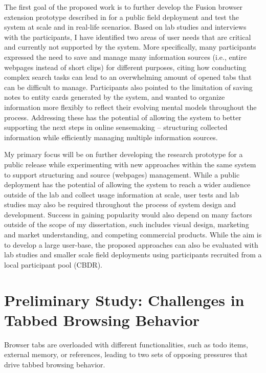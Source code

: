 

The first goal of the proposed work is to further develop the Fusion browser extension prototype described in  for a public field deployment and test the system at scale and in real-life scenarios. Based on lab studies and interviews with the participants, I have identified two areas of user needs that are critical and currently not supported by the system. More specifically, many participants expressed the need to save and manage many information sources (i.e., entire webpages instead of short clips) for different purposes, citing how conducting complex search tasks can lead to an overwhelming amount of opened tabs that can be difficult to manage.
Participants also pointed to the limitation of saving notes to entity cards generated by the system, and wanted to organize information more flexibly to reflect their evolving mental models throughout the process. Addressing these has the potential of allowing the system to better supporting the next steps in online sensemaking -- structuring collected information while efficiently managing multiple information sources.

My primary focus will be on further developing the research prototype for a public release while experimenting with new approaches within the same system to support structuring and source (webpages) management. While a public deployment has the potential of allowing the system to reach a wider audience outside of the lab and collect usage information at scale, user tests and lab studies may also be required throughout the process of system design and development.
Success in gaining popularity would also depend on many factors outside of the scope of my dissertation, such includes visual design, marketing and market understanding, and competing commercial products. While the aim is to develop a large user-base, the proposed approaches can also be evaluated with lab studies and smaller scale field deployments using participants recruited from a local participant pool (CBDR). 




\section{Preliminary Study: Challenges in Tabbed Browsing Behavior}

\begin{table}
\centering
\footnotesize

  \caption[An overview of our findings in the tab usage study.]{Browser tabs are overloaded with different functionalities, such as todo items, external memory, or references, leading to two sets of opposing pressures that drive tabbed browsing behavior.}
  \label{tab:tabs_overview}
\end{table}

